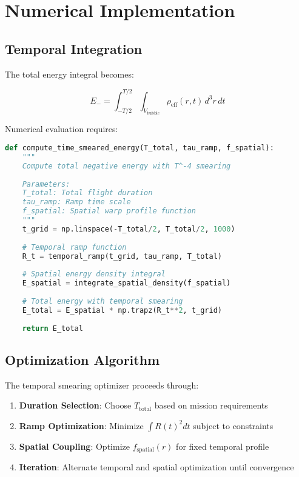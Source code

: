 \documentclass[12pt,a4paper]{article}
\begin{document}
\section{Numerical Implementation}

\subsection{Temporal Integration}

The total energy integral becomes:

\begin{equation}
E_- = \int_{-T/2}^{T/2} \int_{V_{\text{bubble}}} \rho_{\text{eff}}(r,t) \, d^3r \, dt
\end{equation}

Numerical evaluation requires:

\begin{lstlisting}[language=Python]
def compute_time_smeared_energy(T_total, tau_ramp, f_spatial):
    """
    Compute total negative energy with T^-4 smearing
    
    Parameters:
    T_total: Total flight duration
    tau_ramp: Ramp time scale
    f_spatial: Spatial warp profile function
    """
    t_grid = np.linspace(-T_total/2, T_total/2, 1000)
    
    # Temporal ramp function
    R_t = temporal_ramp(t_grid, tau_ramp, T_total)
    
    # Spatial energy density integral
    E_spatial = integrate_spatial_density(f_spatial)
    
    # Total energy with temporal smearing
    E_total = E_spatial * np.trapz(R_t**2, t_grid)
    
    return E_total
\end{lstlisting}

\subsection{Optimization Algorithm}

The temporal smearing optimizer proceeds through:

\begin{enumerate}
\item \textbf{Duration Selection}: Choose $T_{\text{total}}$ based on mission requirements
\item \textbf{Ramp Optimization}: Minimize $\int R(t)^2 dt$ subject to constraints
\item \textbf{Spatial Coupling}: Optimize $f_{\text{spatial}}(r)$ for fixed temporal profile
\item \textbf{Iteration}: Alternate temporal and spatial optimization until convergence
\end{enumerate}
\end{document}
